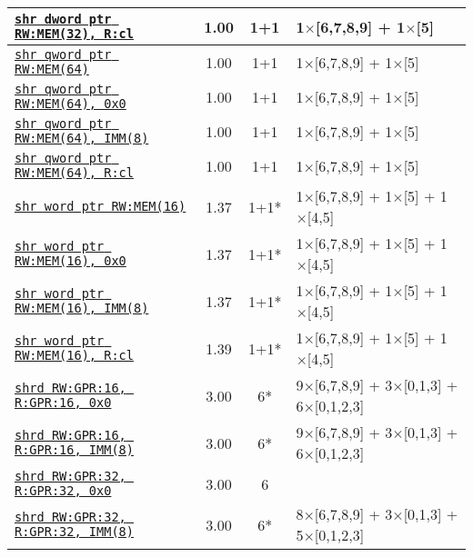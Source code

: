 \documentclass[a4paper,english,fontsize=9]{scrartcl}
\begin{document}
\begin{longtable}{p{}ccL{.25\textwidth}}
  \midrule
  \texttt{\href{https://felixcloutier.com/x86/SAL:SAR:SHL:SHR.html}{shr dword ptr RW:MEM(32), R:cl}} & 1.00 & 1+1 & 1\(\times\)[6,7,8,9] + 1\(\times\)[5] \\
  \midrule
  \texttt{\href{https://felixcloutier.com/x86/SAL:SAR:SHL:SHR.html}{shr qword ptr RW:MEM(64)}} & 1.00 & 1+1 & 1\(\times\)[6,7,8,9] + 1\(\times\)[5] \\
  \midrule
  \texttt{\href{https://felixcloutier.com/x86/SAL:SAR:SHL:SHR.html}{shr qword ptr RW:MEM(64), 0x0}} & 1.00 & 1+1 & 1\(\times\)[6,7,8,9] + 1\(\times\)[5] \\
  \midrule
  \texttt{\href{https://felixcloutier.com/x86/SAL:SAR:SHL:SHR.html}{shr qword ptr RW:MEM(64), IMM(8)}} & 1.00 & 1+1 & 1\(\times\)[6,7,8,9] + 1\(\times\)[5] \\
  \midrule
  \texttt{\href{https://felixcloutier.com/x86/SAL:SAR:SHL:SHR.html}{shr qword ptr RW:MEM(64), R:cl}} & 1.00 & 1+1 & 1\(\times\)[6,7,8,9] + 1\(\times\)[5] \\
  \midrule
  \texttt{\href{https://felixcloutier.com/x86/SAL:SAR:SHL:SHR.html}{shr word ptr RW:MEM(16)}} & 1.37 & 1+1* & 1\(\times\)[6,7,8,9] + 1\(\times\)[5] + 1\(\times\)[4,5] \\
  \midrule
  \texttt{\href{https://felixcloutier.com/x86/SAL:SAR:SHL:SHR.html}{shr word ptr RW:MEM(16), 0x0}} & 1.37 & 1+1* & 1\(\times\)[6,7,8,9] + 1\(\times\)[5] + 1\(\times\)[4,5] \\
  \midrule
  \texttt{\href{https://felixcloutier.com/x86/SAL:SAR:SHL:SHR.html}{shr word ptr RW:MEM(16), IMM(8)}} & 1.37 & 1+1* & 1\(\times\)[6,7,8,9] + 1\(\times\)[5] + 1\(\times\)[4,5] \\
  \midrule
  \texttt{\href{https://felixcloutier.com/x86/SAL:SAR:SHL:SHR.html}{shr word ptr RW:MEM(16), R:cl}} & 1.39 & 1+1* & 1\(\times\)[6,7,8,9] + 1\(\times\)[5] + 1\(\times\)[4,5] \\
  \midrule
  \texttt{\href{https://felixcloutier.com/x86/SHRD.html}{shrd RW:GPR:16, R:GPR:16, 0x0}} & 3.00 & 6* & 9\(\times\)[6,7,8,9] + 3\(\times\)[0,1,3] + 6\(\times\)[0,1,2,3] \\
  \midrule
  \texttt{\href{https://felixcloutier.com/x86/SHRD.html}{shrd RW:GPR:16, R:GPR:16, IMM(8)}} & 3.00 & 6* & 9\(\times\)[6,7,8,9] + 3\(\times\)[0,1,3] + 6\(\times\)[0,1,2,3] \\
  \midrule
  \texttt{\href{https://felixcloutier.com/x86/SHRD.html}{shrd RW:GPR:32, R:GPR:32, 0x0}} & 3.00 & 6 &  \\
  \midrule
  \texttt{\href{https://felixcloutier.com/x86/SHRD.html}{shrd RW:GPR:32, R:GPR:32, IMM(8)}} & 3.00 & 6* & 8\(\times\)[6,7,8,9] + 3\(\times\)[0,1,3] + 5\(\times\)[0,1,2,3] \\

\end{longtable}
\end{document}

